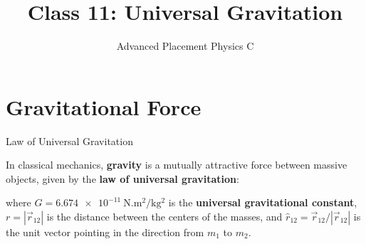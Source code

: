 \documentclass[12pt,compress,aspectratio=169]{beamer}
\title{Class 11: Universal Gravitation}
\subtitle{Advanced Placement Physics C}
\begin{document}
\begin{frame}
  \maketitle
\end{frame}


\section{Gravitational Force}

\begin{frame}{Law of Universal Gravitation}
  \begin{center}
  \end{center}

  In classical mechanics, \textbf{gravity} is a mutually attractive force
  between massive objects, given by the \textbf{law of universal gravitation}:


  where $G=\SI{6.674e-11}{\newton.\metre\squared\per\kilo\gram\squared}$ is the
  \textbf{universal gravitational constant}, $r=|\vec r_{12}|$ is the distance
  between the centers of the masses, and $\hat r_{12}=\vec r_{12}/|\vec r_{12}|$
  is the unit vector pointing in the direction from $m_1$ to $m_2$.
\end{frame}
\end{document}
